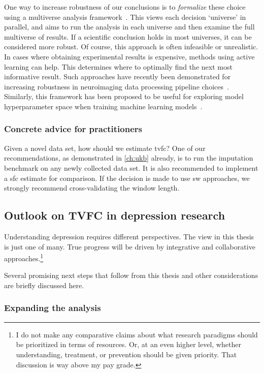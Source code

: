 One way to increase robustness of our conclusions is to \emph{formalize} these choice using a multiverse analysis framework~\parencite{Steegen2016}.
This views each decision `universe' in parallel, and aims to run the analysis in each universe and then examine the full multiverse of results.
If a scientific conclusion holds in most universes, it can be considered more robust.
Of course, this approach is often infeasible or unrealistic.
In cases where obtaining experimental results is expensive, methods using active learning can help.
This determines where to optimally find the next most informative result.
Such approaches have recently been demonstrated for increasing robustness in neuroimaging data processing pipeline choices~\parencite{Dafflon2022}.
Similarly, this framework has been proposed to be useful for exploring model hyperparameter space when training machine learning models~\parencite{Bell2022}.

\subsubsection{Concrete advice for practitioners}

Given a novel data set, how should we estimate \gls{tvfc}?
One of our recommendations, as demonstrated in \cref{ch:ukb} already, is to run the imputation benchmark on any newly collected data set.
It is also recommended to implement a \gls{sfc} estimate for comparison.
If the decision is made to use \gls{sw} approaches, we strongly recommend cross-validating the window length.

\subsection{Outlook on TVFC in depression research}
\label{subsec:outlook-depression}

Understanding depression requires different perspectives.
The view in this thesis is just one of many.
True progress will be driven by integrative and collaborative approaches.\footnote{I do not make any comparative claims about what research paradigms should be prioritized in terms of resources. Or, at an even higher level, whether understanding, treatment, or prevention should be given priority. That discussion is way above my pay grade.}

Several promising next steps that follow from this thesis and other considerations are briefly discussed here.

\subsubsection{Expanding the analysis}


